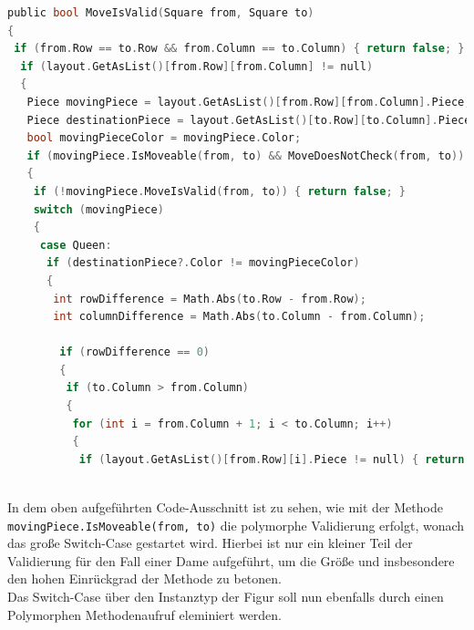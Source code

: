 \documentclass[
10pt, %
a4paper, %
oneside, %
headinclude,footinclude, %
BCOR5mm, %
]{scrartcl}
\begin{document}
\begin{onehalfspace}
\begin{lstlisting}[language=c, style=mStyle]
public bool MoveIsValid(Square from, Square to)
{
 if (from.Row == to.Row && from.Column == to.Column) { return false; }
  if (layout.GetAsList()[from.Row][from.Column] != null)
  {
   Piece movingPiece = layout.GetAsList()[from.Row][from.Column].Piece;
   Piece destinationPiece = layout.GetAsList()[to.Row][to.Column].Piece;
   bool movingPieceColor = movingPiece.Color;
   if (movingPiece.IsMoveable(from, to) && MoveDoesNotCheck(from, to))
   {
	if (!movingPiece.MoveIsValid(from, to)) { return false; }
	switch (movingPiece)
	{
	 case Queen:
	  if (destinationPiece?.Color != movingPieceColor)
	  {
	   int rowDifference = Math.Abs(to.Row - from.Row);
	   int columnDifference = Math.Abs(to.Column - from.Column);

	    if (rowDifference == 0)
		{
		 if (to.Column > from.Column)
		 {
		  for (int i = from.Column + 1; i < to.Column; i++)
		  {
		   if (layout.GetAsList()[from.Row][i].Piece != null) { return false; }
		  
\end{lstlisting}
In dem oben aufgeführten Code-Ausschnitt ist zu sehen, wie mit der Methode \texttt{movingPiece.IsMoveable(from, to)} die polymorphe Validierung erfolgt, wonach das große Switch-Case gestartet wird. Hierbei ist nur ein kleiner Teil der Validierung für den Fall einer Dame aufgeführt, um die Größe  und insbesondere den hohen Einrückgrad der Methode zu betonen. \\
Das Switch-Case über den Instanztyp der Figur soll nun ebenfalls durch einen Polymorphen Methodenaufruf eleminiert werden. 


\end{onehalfspace}
\end{document}
